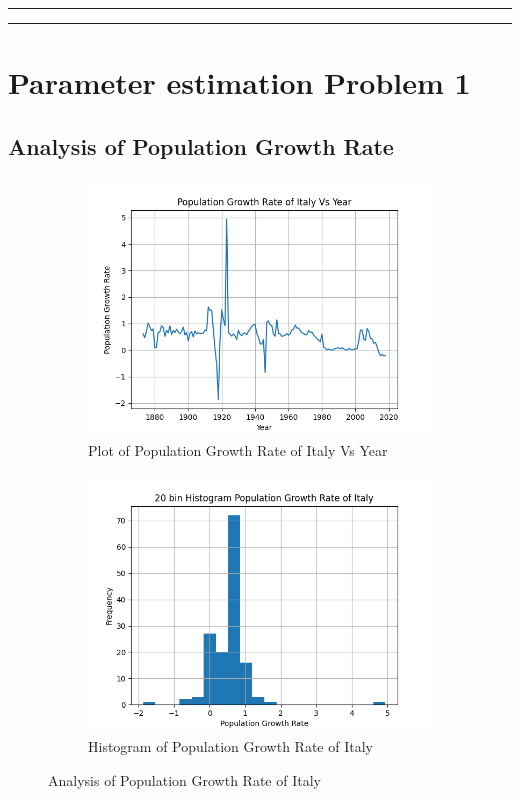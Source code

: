 \documentclass[fleqn, 11pt]{article}
\newcommand{\myline}{
    \par
    \kern3pt %
    \hrule height 0.5pt
    \kern2pt %
    \hrule height 0.5pt
    \kern3pt %
    \par
}
\begin{document}
\vspace{7pt}
\myline


\newpage
\section{Parameter estimation Problem 1}
\setcounter{figure}{0}
\subsection{Analysis of Population Growth Rate}
\begin{figure}[H]
    \centering
    \begin{subfigure}[H]{0.49\textwidth}
        \centering
        \includegraphics[width=\textwidth]{P1/plot.png}
        \caption[]{Plot of Population Growth Rate of Italy Vs Year}
    \end{subfigure}
    \begin{subfigure}[H]{0.49\textwidth}
        \centering
        \includegraphics[width=\textwidth]{P1/hist.png}
        \caption[]{Histogram of Population Growth Rate of Italy}
    \end{subfigure}
    \caption{Analysis of Population Growth Rate of Italy}
\end{figure}
\end{document}

